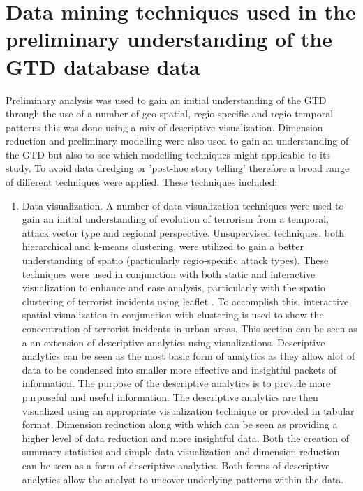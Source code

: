 \section{Data mining techniques used in the preliminary understanding of the GTD database data}
Preliminary analysis was used to gain an initial understanding of the GTD through the use of a number of geo-spatial, regio-specific and regio-temporal patterns this was done using a mix of descriptive visualization. Dimension reduction and preliminary modelling were also used to gain an understanding of the GTD but also to see which modelling techniques might applicable to its study. To avoid data dredging or 'post-hoc story telling' therefore a  broad range of different techniques were applied. These techniques included:
\begin{enumerate}
\item Data visualization. A number of data visualization techniques were used to gain an initial understanding of evolution of terrorism from a temporal, attack vector type and regional perspective. Unsupervised techniques, both hierarchical and k-means clustering, were utilized to gain a better understanding of spatio (particularly regio-specific attack types). These techniques were used in conjunction with both static and interactive visualization to enhance and ease analysis, particularly with the spatio clustering of terrorist incidents using leaflet \citep{leaflet2016}. To accomplish this, interactive spatial visualization in conjunction with clustering is used to show the concentration of terrorist incidents in urban areas. This section can be seen as a an extension of descriptive analytics using visualizations. Descriptive analytics can be seen as the most basic form of analytics as they allow alot of data to be condensed into smaller more effective and insightful packets of information. The purpose of the descriptive analytics is to provide more purposeful and useful information. The descriptive analytics are then visualized using an appropriate visualization technique or provided in
tabular format. Dimension reduction along with which can be seen as providing a higher level of data reduction and more insightful data. Both the creation of summary statistics and simple data visualization and dimension reduction  can be seen as a form of descriptive analytics. Both forms of descriptive analytics allow the analyst to uncover underlying patterns within the data.


\end{enumerate}
